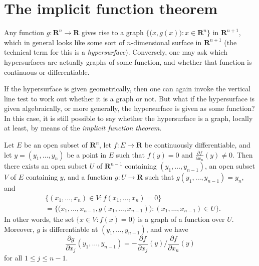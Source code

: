 \section{The implicit function theorem}\label{sec 6.8}

\begin{note}
    Any function \(g : \mathbf{R}^n \to \mathbf{R}\) gives rise to a graph \(\Big\{\big(x, g(x)\big) : x \in \mathbf{R}^n\Big\}\) in \(\mathbf{R}^{n + 1}\), which in general looks like some sort of \(n\)-dimensional surface in \(\mathbf{R}^{n + 1}\)
    (the technical term for this is a \emph{hypersurface}).
    Conversely, one may ask which hypersurfaces are actually graphs of some function, and whether that function is continuous or differentiable.
\end{note}

\begin{note}
    If the hypersurface is given geometrically, then one can again invoke the vertical line test to work out whether it is a graph or not.
    But what if the hypersurface is given algebraically, or more generally, the hypersurface is given as some function?
    In this case, it is still possible to say whether the hypersurface is a graph, locally at least, by means of the \emph{implicit function theorem}.
\end{note}

\begin{theorem}\label{6.8.1}
    Let \(E\) be an open subset of \(\mathbf{R}^n\), let \(f : E \to \mathbf{R}\) be continuously differentiable, and let \(y = (y_1, \dots, y_n)\) be a point in \(E\) such that \(f(y) = 0\) and \(\frac{\partial f}{\partial x_n}(y) \neq 0\).
    Then there exists an open subset \(U\) of \(\mathbf{R}^{n - 1}\) containing \((y_1, \dots, y_{n - 1})\), an open subset \(V\) of \(E\) containing \(y\), and a function \(g : U \to \mathbf{R}\) such that \(g(y_1, \dots, y_{n - 1}) = y_n\), and
    \begin{align*}
         & \{(x_1, \dots, x_n) \in V : f(x_1, \dots, x_n) = 0\}                                                     \\
         & = \Big\{\big(x_1, \dots, x_{n - 1}, g(x_1, \dots, x_{n - 1})\big) : (x_1, \dots, x_{n - 1}) \in U\Big\}.
    \end{align*}
    In other words, the set \(\{x \in V : f(x) = 0\}\) is a graph of a function over \(U\).
    Moreover, \(g\) is differentiable at \((y_1, \dots, y_{n - 1})\), and we have
    \[
        \frac{\partial g}{\partial x_j}(y_1, \dots, y_{n - 1}) = -\frac{\partial f}{\partial x_j}(y) / \frac{\partial f}{\partial x_n}(y) \tag{6.1}\label{eq 6.1}
    \]
    for all \(1 \leq j \leq n - 1\).
\end{theorem}

